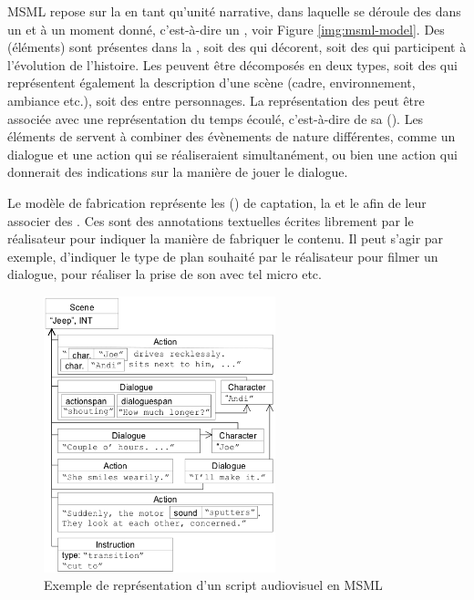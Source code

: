 MSML repose sur la  en tant qu'unité narrative, dans laquelle se déroule des  dans un  et à un moment donné, c'est-à-dire un , voir Figure \ref{img:msml-model}.
Des  (éléments) sont présentes dans la , soit des  qui décorent, soit des  qui participent à l'évolution de l'histoire.
Les  peuvent être décomposés en deux types, soit des  qui représentent également la description d'une scène (cadre, environnement, ambiance etc.), soit des  entre personnages.
La représentation des  peut être associée avec une représentation du temps écoulé, c'est-à-dire de sa  ().
Les éléments de  servent à combiner des évènements de nature différentes, comme un dialogue et une action qui se réaliseraient  simultanément, ou bien une action qui donnerait des indications sur la manière de jouer le dialogue.


Le modèle de fabrication représente les  () de captation, la  et le  afin de leur associer des .
Ces  sont des annotations textuelles écrites librement par le réalisateur pour indiquer la manière de fabriquer le contenu.
Il peut s'agir par exemple, d'indiquer le type de plan souhaité par le réalisateur pour filmer un dialogue, pour réaliser la prise de son avec tel micro etc.

\begin{figure}[ht!]
\centering
\includegraphics[width=0.6\textwidth]{images/MSML-sceneExample.png}
\caption{Exemple de représentation d'un script audiovisuel en MSML}
\label{img:msml-ex}
\end{figure}


